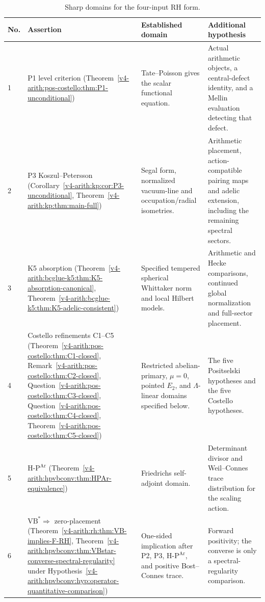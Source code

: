 \begin{table}[h]
\centering
\small
\begin{tabular}{l|p{3.3cm}|p{4.2cm}|p{4.2cm}}
No. & Assertion & Established domain & Additional hypothesis \\
\hline
1 & P1 level criterion
(Theorem~\ref{v4-arith:pos-costello:thm:P1-unconditional}) &
Tate--Poisson gives the scalar functional equation. &
Actual arithmetic objects, a central-defect identity, and a Mellin
evaluation detecting that defect. \\
2 & P3 Koszul--Petersson
(Corollary~\ref{v4-arith:kp:cor:P3-unconditional},
Theorem~\ref{v4-arith:kp:thm:main-full}) &
Segal form, normalized vacuum-line and occupation/radial isometries. &
Arithmetic placement, action-compatible pairing maps and adelic
extension, including the remaining spectral sectors. \\
3 & K5 absorption
(Theorem~\ref{v4-arith:bcglue-k5:thm:K5-absorption-canonical},
Theorem~\ref{v4-arith:bcglue-k5:thm:K5-adelic-consistent}) &
Specified tempered spherical Whittaker norm and local Hilbert models. &
Arithmetic and Hecke comparisons, continued global normalization
and full-sector placement. \\
4 & Costello refinements C1--C5
(Theorem~\ref{v4-arith:pos-costello:thm:C1-closed},
Remark~\ref{v4-arith:pos-costello:thm:C2-closed},
Question~\ref{v4-arith:pos-costello:thm:C3-closed},
Question~\ref{v4-arith:pos-costello:thm:C4-closed},
Theorem~\ref{v4-arith:pos-costello:thm:C5-closed}) &
Restricted abelian-primary, \(\mu=0\), pointed \(E_{2}\), and
\(\Lambda\)-linear domains specified below. &
The five Positselski hypotheses and the five Costello hypotheses. \\
5 & \(\mathrm{H}\text{-}\mathrm{P}^{\mathrm{Ar}}\)
(Theorem~\ref{v4-arith:hpvbconv:thm:HPAr-equivalence}) &
Friedrichs self-adjoint domain. &
Determinant divisor and Weil--Connes trace distribution for the
scaling action. \\
6 & \(\mathrm{VB}^{*}\Rightarrow\) zero-placement
(Theorem~\ref{v4-arith:rh:thm:VB-implies-F-RH},
Theorem~\ref{v4-arith:hpvbconv:thm:VBstar-converse-spectral-regularity} under Hypothesis~\ref{v4-arith:hpvbconv:hyp:operator-quantitative-comparison}) &
One-sided implication after P2, P3,
\(\mathrm{H}\text{-}\mathrm{P}^{\mathrm{Ar}}\), and positive
Bost--Connes trace. &
Forward positivity; the converse is only a spectral-regularity
comparison. \\
\end{tabular}
\caption{Sharp domains for the four-input RH form.}
\label{v4-arith:w3-comparison-B:tab:overextensions}
\end{table}

